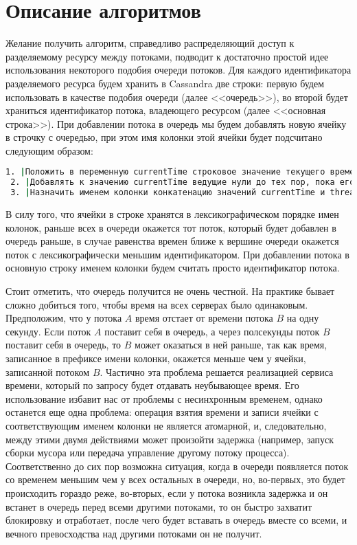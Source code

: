 \section{Описание алгоритмов}

Желание получить алгоритм, справедливо распределяющий доступ к разделяемому ресурсу между потоками, подводит к достаточно простой идее использования некоторого подобия очереди потоков.
Для каждого идентификатора разделяемого ресурса будем хранить в Cassandra две строки: первую будем использовать в качестве подобия очереди (далее <<очередь>>), во второй будет храниться идентификатор потока, владеющего ресурсом (далее <<основная строка>>).
При добавлении потока в очередь мы будем добавлять новую ячейку в строчку с очередью, при этом имя колонки этой ячейки будет подсчитано следующим образом:

\begin{lstlisting}[language=csh,caption={Определение имени колонки для ячейки в очереди}]
 1. |Положить в переменную currentTime строковое значение текущего времени в микросекундах|
 2. |Добавлять к значению currentTime ведущие нули до тех пор, пока его длина не станет равной 20|
 3. |Назначить именем колонки конкатенацию значений currentTime и threadId|
\end{lstlisting}

В силу того, что ячейки в строке хранятся в лексикографическом порядке имен колонок, раньше всех в очереди окажется тот поток, который будет добавлен в очередь раньше, в случае равенства времен ближе к вершине очереди окажется поток с лексикографически меньшим идентификатором.
При добавлении потока в основную строку именем колонки будем считать просто идентификатор потока.

Стоит отметить, что очередь получится не очень честной. На практике бывает сложно добиться того, чтобы время на всех серверах было одинаковым. Предположим, что у потока $A$ время отстает от времени потока $B$ на одну секунду. Если поток $A$ поставит себя в очередь, а через полсекунды поток $B$ поставит себя в очередь, то $B$ может оказаться в ней раньше, так как время, записанное в префиксе имени колонки, окажется меньше чем у ячейки, записанной потоком $B$. Частично эта проблема решается реализацией сервиса времени, который по запросу будет отдавать неубывающее время. Его использование избавит нас от проблемы с несинхронным временем, однако останется еще одна проблема: операция взятия времени и записи ячейки с соответствующим именем колонки не является атомарной, и, следовательно, между этими двумя действиями может произойти задержка (например, запуск сборки мусора или передача управление другому потоку процесса). Соответственно до сих пор возможна ситуация, когда в очереди появляется поток со временем меньшим чем у всех остальных в очереди, но, во-первых, это будет происходить гораздо реже, во-вторых, если у потока возникла задержка и он встанет в очередь перед всеми другими потоками, то он быстро захватит блокировку и отработает, после чего будет вставать в очередь вместе со всеми, и вечного превосходства над другими потоками он не получит.
